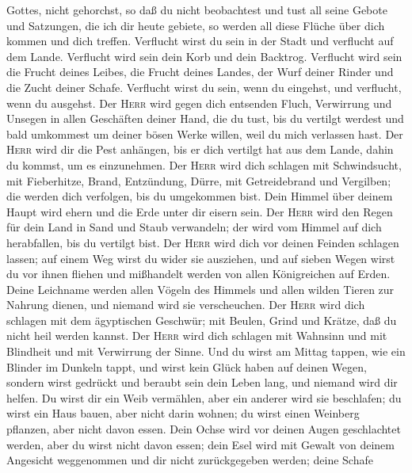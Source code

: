 Gottes, nicht gehorchst, so daß du nicht beobachtest und tust all seine
Gebote und Satzungen, die ich dir heute gebiete, so werden all diese
Flüche über dich kommen und dich treffen.  Verflucht
wirst du sein in der Stadt und verflucht auf dem Lande. 
Verflucht wird sein dein Korb und dein Backtrog. 
Verflucht wird sein die Frucht deines Leibes, die Frucht deines Landes,
der Wurf deiner Rinder und die Zucht deiner Schafe. 
Verflucht wirst du sein, wenn du eingehst, und verflucht, wenn du
ausgehst.  Der \textsc{Herr} wird gegen dich entsenden
Fluch, Verwirrung und Unsegen in allen Geschäften deiner Hand, die du
tust, bis du vertilgt werdest und bald umkommest um deiner bösen Werke
willen, weil du mich verlassen hast.  Der \textsc{Herr}
wird dir die Pest anhängen, bis er dich vertilgt hat aus dem Lande,
dahin du kommst, um es einzunehmen.  Der \textsc{Herr}
wird dich schlagen mit Schwindsucht, mit Fieberhitze, Brand, Entzündung,
Dürre, mit Getreidebrand und Vergilben; die werden dich verfolgen, bis
du umgekommen bist.  Dein Himmel über deinem Haupt wird
ehern und die Erde unter dir eisern sein.  Der
\textsc{Herr} wird den Regen für dein Land in Sand und Staub verwandeln;
der wird vom Himmel auf dich herabfallen, bis du vertilgt bist.
 Der \textsc{Herr} wird dich vor deinen Feinden schlagen
lassen; auf einem Weg wirst du wider sie ausziehen, und auf sieben Wegen
wirst du vor ihnen fliehen und mißhandelt werden von allen Königreichen
auf Erden.  Deine Leichname werden allen Vögeln des
Himmels und allen wilden Tieren zur Nahrung dienen, und niemand wird sie
verscheuchen.  Der \textsc{Herr} wird dich schlagen mit
dem ägyptischen Geschwür; mit Beulen, Grind und Krätze, daß du nicht
heil werden kannst.  Der \textsc{Herr} wird dich schlagen
mit Wahnsinn und mit Blindheit und mit Verwirrung der Sinne.
 Und du wirst am Mittag tappen, wie ein Blinder im
Dunkeln tappt, und wirst kein Glück haben auf deinen Wegen, sondern
wirst gedrückt und beraubt sein dein Leben lang, und niemand wird dir
helfen.  Du wirst dir ein Weib vermählen, aber ein
anderer wird sie beschlafen; du wirst ein Haus bauen, aber nicht darin
wohnen; du wirst einen Weinberg pflanzen, aber nicht davon essen.
 Dein Ochse wird vor deinen Augen geschlachtet werden,
aber du wirst nicht davon essen; dein Esel wird mit Gewalt von deinem
Angesicht weggenommen und dir nicht zurückgegeben werden; deine Schafe
